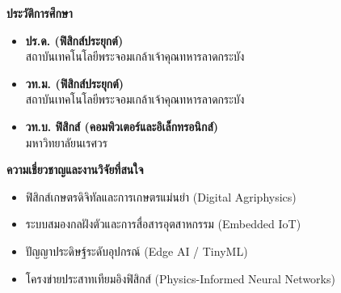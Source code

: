\begin{tcolorbox}[
    enhanced,
    colback=white,
    colframe=rbruNavy,
    boxrule=1pt,
    arc=2mm,
    top=12pt, bottom=12pt, left=14pt, right=14pt,
    drop shadow=black!8
]
    \begin{minipage}[t]{0.48\textwidth}
        {\bfseries\color{rbruNavy} ประวัติการศึกษา}
        \begin{itemize}
            \item \textbf{ปร.ด. (ฟิสิกส์ประยุกต์)}\\สถาบันเทคโนโลยีพระจอมเกล้าเจ้าคุณทหารลาดกระบัง
            \item \textbf{วท.ม. (ฟิสิกส์ประยุกต์)}\\สถาบันเทคโนโลยีพระจอมเกล้าเจ้าคุณทหารลาดกระบัง
            \item \textbf{วท.บ. ฟิสิกส์ (คอมพิวเตอร์และอิเล็กทรอนิกส์)}\\มหาวิทยาลัยนเรศวร
        \end{itemize}
    \end{minipage}%
    \hfill
    \begin{minipage}[t]{0.48\textwidth}
        {\bfseries\color{rbruNavy} ความเชี่ยวชาญและงานวิจัยที่สนใจ}
        \begin{itemize}
            \item ฟิสิกส์เกษตรดิจิทัลและการเกษตรแม่นยำ (Digital Agriphysics)
            \item ระบบสมองกลฝังตัวและการสื่อสารอุตสาหกรรม (Embedded IoT)
            \item ปัญญาประดิษฐ์ระดับอุปกรณ์ (Edge AI / TinyML)
            \item โครงข่ายประสาทเทียมอิงฟิสิกส์ (Physics-Informed Neural Networks)
        \end{itemize}
    \end{minipage}
\end{tcolorbox}
